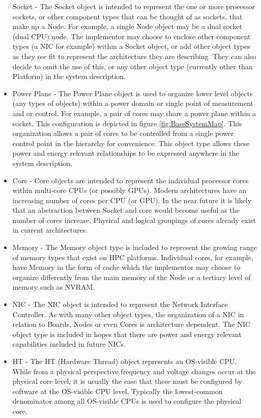 \begin{itemize}[noitemsep,nolistsep]
{Socket - The Socket object is intended to represent the one or more processor sockets, or other component types that can be thought of as sockets, that make up a Node. 
For example, a single Node object may be a dual socket (dual CPU) node.
The implementor may choose to enclose other component types (a NIC for example) within a Socket object, or add other object types as they see fit to represent the architecture they are describing.
They can also decide to omit the use of this, or any other object type (currently other than Platform) in the system description.
}
	\item{
Power Plane - The Power Plane object is used to organize lower level objects (any types of objects) within a power domain or single point of measurement and or control.
For example, a pair of cores may share a power plane within a socket. 
This configuration is depicted in figure \ref{fig:BaseSystemMap}. 
This organization allows a pair of cores to be controlled from a single power control point in the hierarchy for convenience. 
This object type allows these power and energy relevant relationships to be expressed anywhere in the system description.
}
	\item{
Core - Core objects are intended to represent the individual processor cores within multi-core CPUs (or possibly GPUs). 
Modern architectures have an increasing number of cores per CPU (or GPU). 
In the near future it is likely that an abstraction between Socket and core would become useful as the number of cores increase. 
Physical and logical groupings of cores already exist in current architectures.
}
	\item{Memory - The Memory object type is included to represent the growing range of memory types that exist on HPC platforms. 
Individual cores, for example, have Memory in the form of cache which the implementor may choose to organize differently from the main memory of the Node or a tertiary level of memory such as NVRAM.
}	
	\item{
NIC - The NIC object is intended to represent the Network Interface Controller.
As with many other object types, the organization of a NIC in relation to Boards, Nodes or even Cores is architecture dependent.
The NIC object type is included in hopes that there are power and energy relevant capabilities included in future NICs.
}	
        \item{
HT - The HT (Hardware Thread) object represents an OS-visible CPU.  
While from a physical perspective frequency and voltage changes occur at the physical core level, it is usually the case that these must be configured by software at the OS-visible CPU level.  
Typically the lowest-common denominator among all OS-visible CPUs is used to configure the physical core.
}

\end{itemize}

